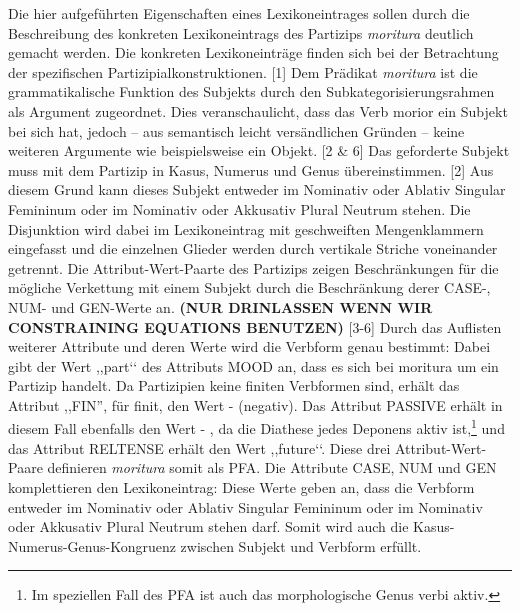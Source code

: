 \documentclass[12pt,a4paper]{article}
\begin{document}
Die hier aufgeführten Eigenschaften eines Lexikoneintrages sollen durch die Beschreibung des konkreten Lexikoneintrags des Partizips \textit{moritura} deutlich gemacht werden. Die konkreten Lexikoneinträge finden sich bei der Betrachtung der spezifischen Partizipialkonstruktionen. [1] Dem Prädikat \textit{moritura} ist die grammatikalische Funktion des Subjekts durch den Subkategorisierungsrahmen als Argument zugeordnet. Dies veranschaulicht, dass das Verb morior ein Subjekt bei sich hat, jedoch -- aus semantisch leicht versändlichen Gründen -- keine weiteren Argumente wie beispielsweise ein Objekt.
[2 \& 6] Das geforderte Subjekt muss mit dem Partizip in Kasus, Numerus und Genus übereinstimmen. [2] Aus diesem Grund kann dieses Subjekt entweder im Nominativ oder Ablativ Singular Femininum oder im Nominativ oder Akkusativ Plural Neutrum stehen. Die Disjunktion wird dabei im Lexikoneintrag mit geschweiften Mengenklammern eingefasst und die einzelnen Glieder werden durch vertikale Striche voneinander getrennt. Die Attribut-Wert-Paarte des Partizips zeigen Beschränkungen für die mögliche Verkettung mit einem Subjekt durch die Beschränkung derer CASE-, NUM- und GEN-Werte an. \textbf{(NUR DRINLASSEN WENN WIR CONSTRAINING EQUATIONS BENUTZEN)}
[3-6] Durch das Auflisten weiterer Attribute und deren Werte wird die Verbform genau bestimmt: Dabei gibt der Wert ,,part‘‘ des Attributs MOOD an, dass es sich bei moritura um ein Partizip handelt. Da Partizipien keine finiten Verbformen sind, erhält das Attribut ,,FIN'', für finit, den Wert - (negativ). Das Attribut PASSIVE erhält in diesem Fall ebenfalls den Wert - , da die Diathese jedes Deponens aktiv ist,\footnote{Im speziellen Fall des PFA ist auch das morphologische Genus verbi aktiv.} und das Attribut RELTENSE erhält den Wert ,,future‘‘. Diese drei Attribut-Wert-Paare definieren \textit{moritura} somit als PFA. Die Attribute CASE, NUM und GEN komplettieren den Lexikoneintrag: Diese Werte geben an, dass die Verbform entweder im Nominativ oder Ablativ Singular Femininum oder im Nominativ oder Akkusativ Plural Neutrum stehen darf. Somit wird auch die Kasus-Numerus-Genus-Kongruenz zwischen Subjekt und Verbform erfüllt.


\end{document}
